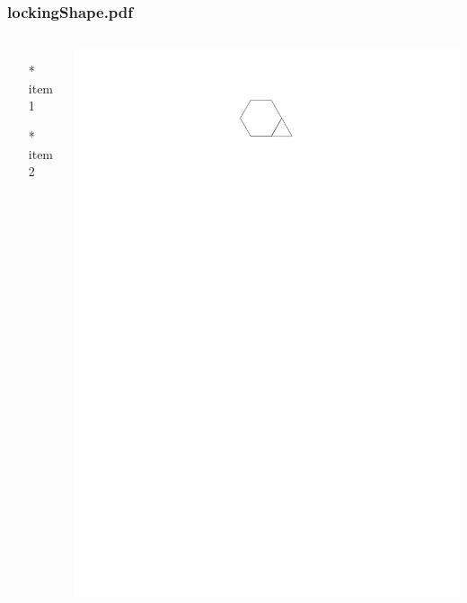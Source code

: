 \begin{frame} \frametitle{lockingShape.pdf}
    \begin{columns}[c]
        \begin{itemize}
            \item[*] item 1
            \item[*] item 2
        \end{itemize}
        \begin{minipage}{\linewidth}
            \begin{center}
            \includegraphics[width=.9\textwidth]{graphics/lockingShape.pdf}
            \label{gfx:lockingShape.pdf}
            \end{center}
        \end{minipage}
    \end{columns}
\end{frame}

